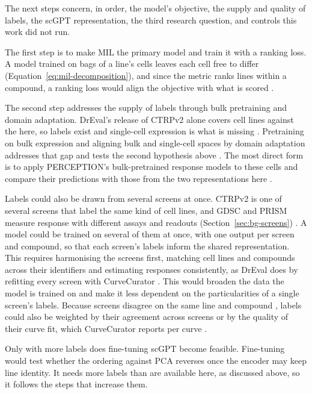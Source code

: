 The next steps concern, in order, the model's objective, the supply and quality of labels, the scGPT
representation, the third research question, and controls this work did not run.

The first step is to make MIL the primary model and train it with a ranking loss. A model trained on bags of a line's cells
leaves each cell free to differ (Equation~\ref{eq:mil-decomposition}), and since the metric ranks lines
within a compound, a ranking loss would align the objective with what is scored
\cite{ilse2018,burges2005}.

The second step addresses the supply of labels through bulk pretraining and domain adaptation. DrEval's release of CTRPv2 alone covers \NCtrpLines{} cell
lines against the \NLines{} here, so labels exist and single-cell expression is what is missing
\cite{dreval_data,scdeal}. Pretraining on bulk expression and aligning bulk and single-cell spaces by
domain adaptation addresses that gap and tests the second hypothesis above \cite{scdeal,ganin2015}.
The most direct form is to apply PERCEPTION's
bulk-pretrained response models to these cells and compare their predictions with those from the two
representations here \cite{perception}.

Labels could also be drawn from several screens at once. CTRPv2 is one of several screens that label the same kind of cell
lines, and GDSC and PRISM measure response with different assays and readouts
(Section~\ref{sec:bg-screens}) \cite{gdsc_yang2013,corsello2020}. A model could be trained on several of them at
once, with one output per screen and compound, so that each screen's labels inform the shared
representation. This requires harmonising the screens first, matching cell lines and compounds across
their identifiers and estimating responses consistently, as DrEval does by refitting every screen with
CurveCurator \cite{dreval}. This would broaden the data the model is trained on and make it less dependent on the
particularities of a single screen's labels. Because screens disagree on the same line and compound
\cite{haibekains2013,safikhani2017}, labels could also be weighted by their agreement across screens or by the quality
of their curve fit, which CurveCurator reports per curve \cite{bayer2023curvecurator}.

Only with more labels does fine-tuning scGPT become feasible. Fine-tuning would test whether the
ordering against PCA reverses once the encoder may keep line identity. It needs more labels than are
available here, as discussed above, so it follows the steps that increase them.

